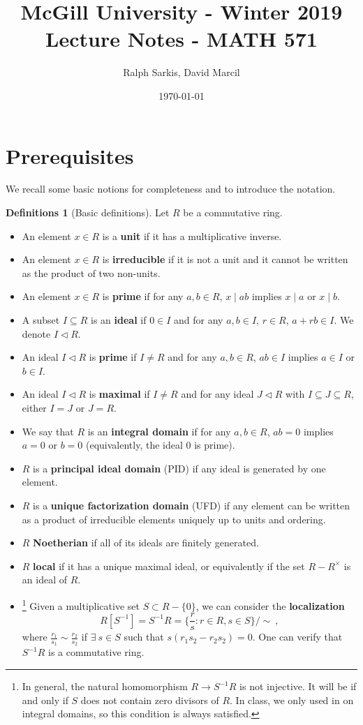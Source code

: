 \documentclass{tufte-handout} %
\title{	
	\normalfont\normalsize 
	{McGill University - Winter 2019} \\ [0pt] %
	\huge Lecture Notes - MATH 571%
}\author{Ralph Sarkis, David Marcil} %
\date{\vspace{-5pt}\normalsize\today} %
\theoremstyle{definition}
\newtheorem{defns}[thm]{Definitions}
\theoremstyle{remark}
\begin{document}
\justifying 
\maketitle

\tableofcontents

\section{Prerequisites}
We recall some basic notions for completeness and to introduce the notation.
\begin{defns}[Basic definitions]
	Let $R$ be a commutative ring.
	\begin{itemize}
		\item An element $x \in R$ is a \textbf{unit} if it has a multiplicative inverse.
		\item An element $x \in R$ is \textbf{irreducible} if it is not a unit and it cannot be written as the product of two non-units.
		\item An element $x \in R$ is \textbf{prime} if for any $a,b \in R$, $x \mid ab$ implies $x \mid a$ or $x \mid b$.
		\item A subset $I \subseteq R$ is an \textbf{ideal} if $0 \in I$ and for any $a,b \in I$, $r \in R$, $a+rb \in I$. We denote $I \lhd R$.
		\item An ideal $I \lhd R$ is \textbf{prime} if $I\neq R$ and for any $a,b \in R$, $ab \in I$ implies $a \in I$ or $b \in I$.
		\item An ideal $I \lhd R$ is \textbf{maximal} if $I\neq R$ and for any ideal $J\lhd R$ with $I \subseteq J \subseteq R$, either $I = J$ or $J = R$.
		\item We say that $R$ is an \textbf{integral domain} if for any $a,b \in R$, $ab = 0$ implies $a = 0$ or $b = 0$ (equivalently, the ideal $0$ is prime).
		\item $R$ is a \textbf{principal ideal domain} (PID) if any ideal is generated by one element.
		\item $R$ is a \textbf{unique factorization domain} (UFD) if any element can be written as a product of irreducible elements uniquely up to units and ordering.
		\item $R$ \textbf{Noetherian} if all of its ideals are finitely generated.
		\item $R$ \textbf{local} if it has a unique maximal ideal, or equivalently if the set $R - R^\times$ is an ideal of $R$.
		\item \footnote{In general, the natural homomorphism $R \to S^{-1}R$ is not injective. It will be if and only if $S$ does not contain zero divisors of $R$. In class, we only used in on integral domains, so this condition is always satisfied.} Given a multiplicative set $S \subset R - \{0\}$, we can consider the \textbf{localization} $$R[S^{-1}] = S^{-1}R = \{\frac{r}{s} : r \in R, s \in S\}/\sim \ ,$$ where $\frac{r_1}{s_1} \sim \frac{r_2}{s_2}$ if $\exists\ s \in S$ such that $s(r_1s_2 - r_2s_2) = 0$. One can verify that $S^{-1}R$ is a commutative ring.

\end{itemize}
\end{defns}
\end{document}
